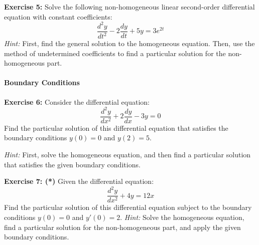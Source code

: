 \documentclass[]{article}
\begin{document}
	\textbf{Exercise 5:}
	Solve the following non-homogeneous linear second-order differential equation with constant coefficients:
	$$
	\frac{d^2y}{dt^2} - 2\frac{dy}{dt} + 5y = 3e^{2t}
	$$
	\textit{Hint:} First, find the general solution to the homogeneous equation. Then, use the method of undetermined coefficients to find a particular solution for the non-homogeneous part.
	
	\paragraph{Boundary Conditions}\mbox{}
	
	\textbf{Exercise 6:}
	Consider the differential equation:
	$$
	\frac{d^2y}{dx^2} + 2\frac{dy}{dx} - 3y = 0
	$$
	Find the particular solution of this differential equation that satisfies the boundary conditions $y(0) = 0$ and $y(2) = 5$.
	
	\textit{Hint:} First, solve the homogeneous equation, and then find a particular solution that satisfies the given boundary conditions.
	
	\textbf{Exercise 7: (*)}
	Given the differential equation:
	$$
	\frac{d^2y}{dx^2} + 4y = 12x
	$$
	Find the particular solution of this differential equation subject to the boundary conditions $y(0) = 0$ and $y'(0) = 2$.
	\textit{Hint:} Solve the homogeneous equation, find a particular solution for the non-homogeneous part, and apply the given boundary conditions.
	
	
	
\end{document}
